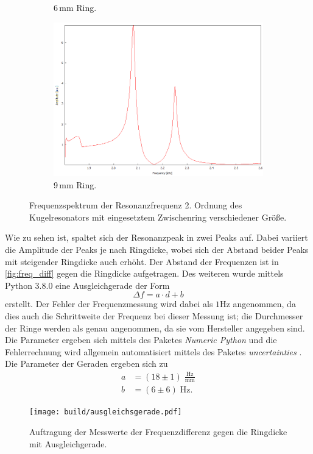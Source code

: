 \begin{figure}
\begin{subfigure}[b]{0.33\textwidth}
        \caption{6\,mm Ring.}
    \end{subfigure}
    \hfill
    \begin{subfigure}[b]{0.33\textwidth}
        \centering
        \includegraphics[width=\textwidth]{data/2_4/9mm.png}
        \caption{9\,mm Ring.}
    \end{subfigure}
    \hfill
    \caption{Frequenzspektrum der Resonanzfrequenz 2. Ordnung des Kugelresonators mit eingesetztem Zwischenring verschiedener Größe.}
    \label{fig:ringe}
\end{figure}
Wie zu sehen ist, spaltet sich der Resonanzpeak in zwei Peaks auf. Dabei variiert die Amplitude 
der Peaks je nach Ringdicke, wobei sich der Abstand beider Peaks mit steigender
Ringdicke auch erhöht. Der Abstand der Frequenzen ist in \autoref{fig:freq_diff} gegen die 
Ringdicke aufgetragen. Des weiteren wurde mittels Python 3.8.0 eine Ausgleichgerade der Form
\begin{equation*}
     \Delta f = a \cdot d + b
\end{equation*}
erstellt. Der Fehler der Frequenzmessung wird dabei als $1$\;Hz angenommen, da dies auch die 
Schrittweite der Frequenz bei dieser Messung ist; die Durchmesser der Ringe werden als genau
angenommen, da sie vom Hersteller angegeben sind. Die Parameter ergeben sich mittels des Paketes
\textit{Numeric Python} \cite{numpy} und die Fehlerrechnung wird allgemein automatisiert 
mittels des Paketes \textit{uncertainties} \cite{uncertainties}.
Die Parameter der Geraden ergeben sich zu 
\begin{align*}
    a &= (18 \pm 1) \;\frac{\text{Hz}}{\text{mm}} \\
    b &= ( 6 \pm 6) \;\text{Hz}.
\end{align*} 
\begin{figure}[h]
    \centering 
    \texttt{[image: build/ausgleichsgerade.pdf]}
    \caption{Auftragung der Messwerte der Frequenzdifferenz gegen die Ringdicke mit Ausgleichgerade.}
    \label{fig:freq_diff}
\end{figure}

